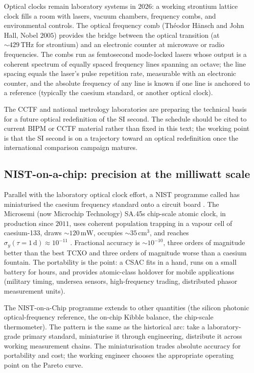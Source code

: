 Optical clocks remain laboratory systems in $2026$: a working
strontium lattice clock fills a room with lasers, vacuum chambers,
frequency combs, and environmental controls. The optical
frequency comb (Th\'eodor H\"ansch and John Hall, Nobel $2005$)
provides the bridge between the optical transition (at $\sim 429
\,\si{\tera\hertz}$ for strontium) and an electronic counter at
microwave or radio frequencies. The combs run as femtosecond
mode-locked lasers whose output is a coherent spectrum of equally
spaced frequency lines spanning an octave; the line spacing
equals the laser's pulse repetition rate, measurable with an
electronic counter, and the absolute frequency of any line is
known if one line is anchored to a reference (typically the
caesium standard, or another optical clock).

The CCTF and national metrology laboratories are preparing the
technical basis for a future optical redefinition of the SI
second. The schedule should be cited to current BIPM or CCTF
material rather than fixed in this text; the working point is
that the SI second is on a trajectory toward an optical
redefinition once the international comparison campaign matures.

\subsection{NIST-on-a-chip: precision at the milliwatt scale}

Parallel with the laboratory optical clock effort, a NIST
programme called  has miniaturised the
caesium frequency standard onto a circuit board
\cite{web:ch06t3-nist-on-a-chip-2024}. The Microsemi (now
Microchip Technology) SA.45s chip-scale atomic clock, in
production since $2011$, uses coherent population trapping in a
vapour cell of caesium-133, draws $\sim 120 \,\si{\milli\watt}$,
occupies $\sim 35 \,\si{\centi\meter\cubed}$, and reaches
$\sigma_{y}(\tau = 1 \,\si{\day}) \approx 10^{-11}$
\cite{web:ch06t3-microsemi-csac-2024}. Fractional accuracy is
$\sim 10^{-10}$, three orders of magnitude better than the best
TCXO and three orders of magnitude worse than a caesium fountain.
The portability is the point: a CSAC fits in a hand, runs on a
small battery for hours, and provides atomic-class holdover for
mobile applications (military timing, undersea sensors,
high-frequency trading, distributed phasor measurement units).

The NIST-on-a-Chip programme extends to other quantities (the
silicon photonic optical-frequency reference, the on-chip Kibble
balance, the chip-scale thermometer). The pattern is the same as
the historical arc: take a laboratory-grade primary standard,
miniaturise it through engineering, distribute it across working
measurement chains. The miniaturisation trades absolute accuracy
for portability and cost; the working engineer chooses the
appropriate operating point on the Pareto curve.

